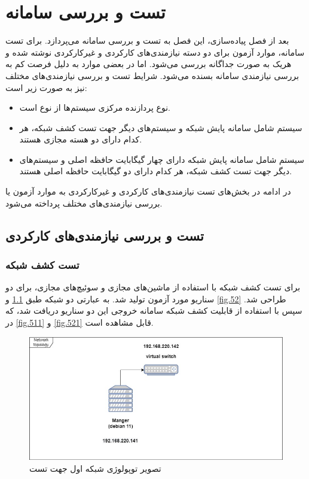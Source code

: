 \chapter{تست و بررسی سامانه}

بعد از فصل پیاده‌سازی، این فصل به تست و بررسی سامانه می‌پردازد. برای تست سامانه، موارد آزمون برای دو دسته نیازمندی‌های کارکردی و غیرکارکردی نوشته شده و هریک به صورت جداگانه بررسی می‌شود. اما در بعضی موارد به دلیل فرصت کم به بررسی نیازمندی‌ سامانه بسنده می‌شود. شرایط تست و بررسی نیازمندی‌های مختلف نیز به صورت زیر است:
\begin{itemize}
    \item نوع پردازنده مرکزی سیستم‌ها از نوع  است.
    \item سیستم شامل سامانه پایش شبکه و سیستم‌های دیگر جهت تست کشف شبکه، هر کدام دارای دو هسته مجازی هستند.
    \item سیستم شامل سامانه پایش شبکه دارای چهار گیگابایت حافظه اصلی و سیستم‌های دیگر جهت تست کشف شبکه، هر کدام دارای دو گیگابایت حافظه اصلی هستند.
\end{itemize}


در ادامه در بخش‌های تست نیازمندی‌های کارکردی و غیرکارکردی به موارد آزمون یا بررسی نیازمندی‌های مختلف پرداخته می‌شود.

\section{تست و بررسی نیازمندی‌های کارکردی}

\subsection{تست کشف شبکه}

برای تست کشف شبکه با استفاده از ماشین‌های مجازی و سوئیچ‌های مجازی، برای دو سناریو مورد آزمون تولید شد. به عبارتی دو شبکه طبق \cref{fig.51} و \cref{fig.52} طراحی شد. سپس با استفاده از قابلیت کشف شبکه سامانه خروجی این دو سناریو دریافت شد، که در \cref{fig.511} و \cref{fig.521} قابل مشاهده است.



\begin{figure}[!h]
    \centering\includegraphics[scale=.55]{./topo-test1}
    \caption{تصویر توپولوژی شبکه اول جهت تست}\label{fig.51}
\end{figure}


